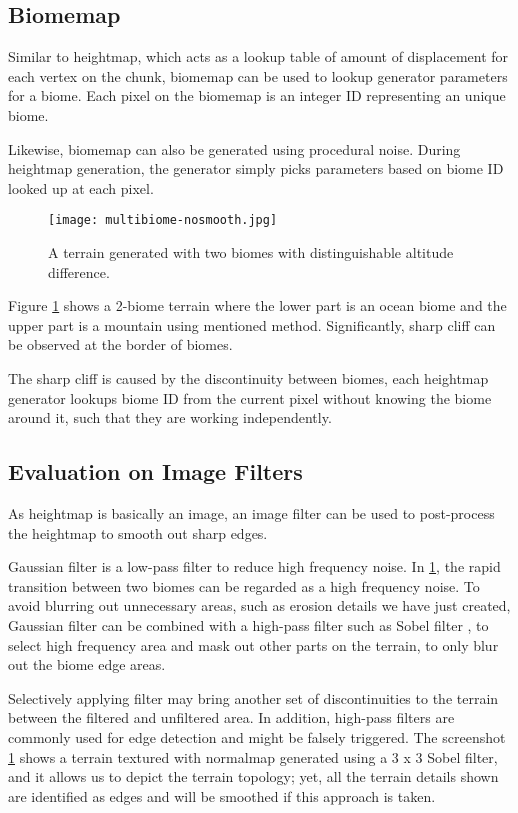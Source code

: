 \documentclass[oneside, a4paper]{report}
\begin{document}
    \subsection{Biomemap}

    Similar to heightmap, which acts as a lookup table of amount of displacement for each vertex on the chunk, biomemap can be used to lookup generator parameters for a biome. Each pixel on the biomemap is an integer ID representing an unique biome.

    Likewise, biomemap can also be generated using procedural noise. During heightmap generation, the generator simply picks parameters based on biome ID looked up at each pixel.

    \begin{figure}[H]
        \texttt{[image: multibiome-nosmooth.jpg]}
        \caption{A terrain generated with two biomes with distinguishable altitude difference.}
        \label{multibiome_simple}
    \end{figure}

    Figure \ref{multibiome_simple} shows a 2-biome terrain where the lower part is an ocean biome and the upper part is a mountain using mentioned method. Significantly, sharp cliff can be observed at the border of biomes.

    The sharp cliff is caused by the discontinuity between biomes, each heightmap generator lookups biome ID from the current pixel without knowing the biome around it, such that they are working independently.

    \subsection{Evaluation on Image Filters}

    As heightmap is basically an image, an image filter can be used to post-process the heightmap to smooth out sharp edges.

    Gaussian filter is a low-pass filter to reduce high frequency noise. In \ref{multibiome_simple}, the rapid transition between two biomes can be regarded as a high frequency noise. To avoid blurring out unnecessary areas, such as erosion details we have just created, Gaussian filter can be combined with a high-pass filter such as Sobel filter \cite{sobel_filter}, to select high frequency area and mask out other parts on the terrain, to only blur out the biome edge areas.

    Selectively applying filter may bring another set of discontinuities to the terrain between the filtered and unfiltered area. In addition, high-pass filters are commonly used for edge detection and might be falsely triggered. The screenshot \ref{multibiome_simple} shows a terrain textured with normalmap generated using a 3 x 3 Sobel filter, and it allows us to depict the terrain topology; yet, all the terrain details shown are identified as edges and will be smoothed if this approach is taken.
\end{document}
